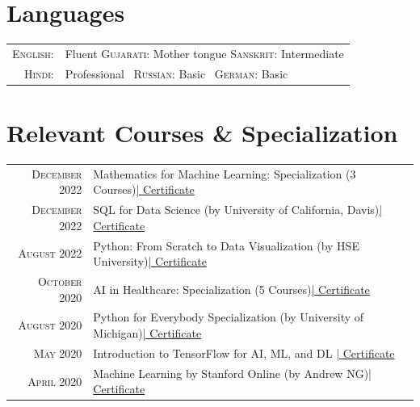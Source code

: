 \documentclass[a4paper,10pt]{article} %
\begin{document}

\section{Languages}

\begin{tabular}{rl}
\textsc{English:} & Fluent \qquad \qquad \qquad   \textsc{Gujarati:} \enspace Mother tongue \qquad \qquad \textsc{Sanskrit:} \enspace Intermediate \\

\textsc{Hindi:} & Professional \qquad \enspace \enspace \enspace  \  \textsc{Russian:} \enspace Basic \qquad \qquad \qquad \enspace \enspace \enspace \enspace \: \   \textsc{German:} \enspace Basic\\

\end{tabular}

\section{Relevant Courses \& Specialization}
\begin{tabular}{rp{11cm}r}
	\textsc{December 2022} &  Mathematics for Machine Learning: Specialization \footnotesize(3 Courses)\normalsize\href{https://coursera.org/verify/specialization/TXDLZSR9792P}{\hfill | \footnotesize Certificate}\\
	\textsc{December 2022} & SQL for Data Science \footnotesize(by University of California, Davis)\normalsize\href{https://coursera.org/verify/UE3N5M4WRRDK}{\hfill | \footnotesize Certificate} \\
	\textsc{August 2022} & Python: From Scratch to Data Visualization \footnotesize(by HSE University)\normalsize\href{https://drive.google.com/file/d/1YRf4fjrd9PRfQaVNCkcWe9OTWG-HjbqU/view?usp=share_link}{\hfill | \footnotesize Certificate}\\
    \textsc{October 2020} & AI in Healthcare: Specialization \footnotesize(5 Courses)\normalsize\href{https://coursera.org/verify/specialization/QM3JUXZS9FS3}{\hfill | \footnotesize Certificate}\\
    \textsc{August 2020} & Python for Everybody Specialization \footnotesize(by University of Michigan)\normalsize\href{https://coursera.org/verify/RVTZSMMVGH3K}{\hfill | \footnotesize Certificate}\\
    \textsc{May 2020} & Introduction to TensorFlow for AI, ML, and DL \footnotesize\normalsize\href{https://coursera.org/verify/42WLFE8NLMRF}{\hfill | \footnotesize Certificate}\\
    \textsc{April 2020} &  Machine Learning {by Stanford Online} \footnotesize(by Andrew NG)\normalsize\href{https://coursera.org/verify/9QAAQEEFQYGG}{\hfill | \footnotesize Certificate}\\
    
    
\end{tabular}
\end{document}
